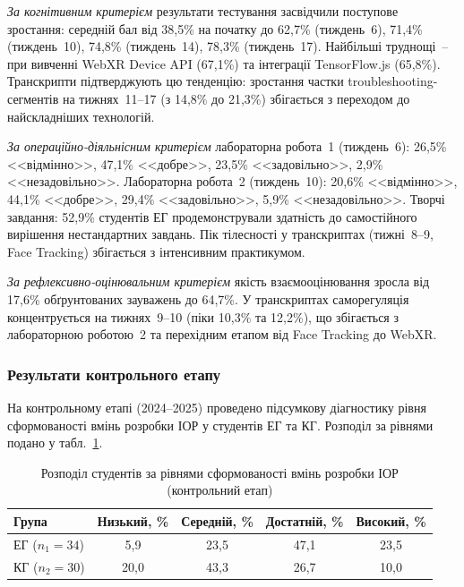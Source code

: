 \textit{За когнітивним критерієм} результати тестування засвідчили поступове зростання: середній бал від 38,5\% на початку до 62,7\% (тиждень~6), 71,4\% (тиждень~10), 74,8\% (тиждень~14), 78,3\% (тиждень~17). Найбільші труднощі~-- при вивченні WebXR Device API (67,1\%) та інтеграції TensorFlow.js (65,8\%). Транскрипти підтверджують цю тенденцію: зростання частки troubleshooting-сегментів на тижнях~11--17 (з 14,8\% до 21,3\%) збігається з переходом до найскладніших технологій.

\textit{За операційно-діяльнісним критерієм} лабораторна робота~1 (тиждень~6): 26,5\% <<відмінно>>, 47,1\% <<добре>>, 23,5\% <<задовільно>>, 2,9\% <<незадовільно>>. Лабораторна робота~2 (тиждень~10): 20,6\% <<відмінно>>, 44,1\% <<добре>>, 29,4\% <<задовільно>>, 5,9\% <<незадовільно>>. Творчі завдання: 52,9\% студентів ЕГ продемонстрували здатність до самостійного вирішення нестандартних завдань. Пік тілесності у транскриптах (тижні~8--9, Face Tracking) збігається з інтенсивним практикумом.

\textit{За рефлексивно-оцінювальним критерієм} якість взаємооцінювання зросла від 17,6\% обґрунтованих зауважень до 64,7\%. У транскриптах саморегуляція концентрується на тижнях~9--10 (піки 10,3\% та 12,2\%), що збігається з лабораторною роботою~2 та перехідним етапом від Face Tracking до WebXR.


\subsubsection{Результати контрольного етапу}


На контрольному етапі (2024--2025) проведено підсумкову діагностику рівня сформованості вмінь розробки ІОР у студентів ЕГ та КГ. Розподіл за рівнями подано у табл.~\ref{tab:kontrol}.

\begin{table}[!h]
\caption{Розподіл студентів за рівнями сформованості вмінь розробки ІОР (контрольний етап)}
\label{tab:kontrol}
\centering\small
\begin{tabular}{|l|c|c|c|c|}
\hline
\hfill \textbf{Група} & \textbf{Низький, \%} & \textbf{Середній, \%} & \textbf{Достатній, \%} & \textbf{Високий, \%} \\
\hline
ЕГ ($n_1 = 34$) & 5,9 & 23,5 & 47,1 & 23,5 \\
\hline
КГ ($n_2 = 30$) & 20,0 & 43,3 & 26,7 & 10,0 \\
\hline
\end{tabular}
\end{table}

